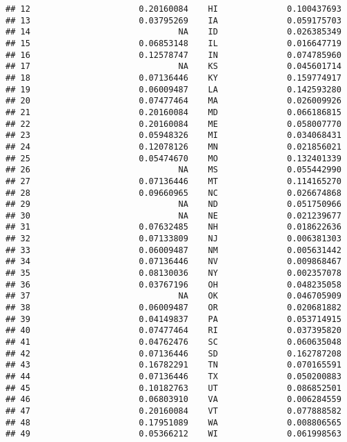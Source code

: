 \documentclass{article}\usepackage[]{graphicx}\usepackage[]{color}
\makeatletter
\newenvironment{kframe}{%
 \def\at@end@of@kframe{}%
 \ifinner\ifhmode%
  \def\at@end@of@kframe{\end{minipage}}%
  \begin{minipage}{\columnwidth}%
 \fi\fi%
 \def\FrameCommand##1{\hskip\@totalleftmargin \hskip-\fboxsep
 \colorbox{shadecolor}{##1}\hskip-\fboxsep
     \hskip-\linewidth \hskip-\@totalleftmargin \hskip\columnwidth}%
 \MakeFramed {\advance\hsize-\width
   \@totalleftmargin\z@ \linewidth\hsize
   \@setminipage}}%
 {\par\unskip\endMakeFramed%
 \at@end@of@kframe}
\newenvironment{knitrout}{}{} %
\makeatother
\begin{document}
\begin{knitrout}
\begin{kframe}
\begin{verbatim}
## 12                      0.20160084    HI              0.100437693
## 13                      0.03795269    IA              0.059175703
## 14                              NA    ID              0.026385349
## 15                      0.06853148    IL              0.016647719
## 16                      0.12578747    IN              0.074785960
## 17                              NA    KS              0.045601714
## 18                      0.07136446    KY              0.159774917
## 19                      0.06009487    LA              0.142593280
## 20                      0.07477464    MA              0.026009926
## 21                      0.20160084    MD              0.066186815
## 22                      0.20160084    ME              0.058007770
## 23                      0.05948326    MI              0.034068431
## 24                      0.12078126    MN              0.021856021
## 25                      0.05474670    MO              0.132401339
## 26                              NA    MS              0.055442990
## 27                      0.07136446    MT              0.114165270
## 28                      0.09660965    NC              0.026674868
## 29                              NA    ND              0.051750966
## 30                              NA    NE              0.021239677
## 31                      0.07632485    NH              0.018622636
## 32                      0.07133809    NJ              0.006381303
## 33                      0.06009487    NM              0.005631442
## 34                      0.07136446    NV              0.009868467
## 35                      0.08130036    NY              0.002357078
## 36                      0.03767196    OH              0.048235058
## 37                              NA    OK              0.046705909
## 38                      0.06009487    OR              0.020681882
## 39                      0.04149837    PA              0.053714915
## 40                      0.07477464    RI              0.037395820
## 41                      0.04762476    SC              0.060635048
## 42                      0.07136446    SD              0.162787208
## 43                      0.16782291    TN              0.070165591
## 44                      0.07136446    TX              0.050200883
## 45                      0.10182763    UT              0.086852501
## 46                      0.06803910    VA              0.006284559
## 47                      0.20160084    VT              0.077888582
## 48                      0.17951089    WA              0.008806565
## 49                      0.05366212    WI              0.061998563

\end{verbatim}
\end{kframe}
\end{knitrout}
\end{document}
